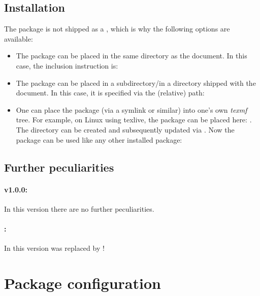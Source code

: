 \documentclass{sopra-base}
\begin{document}
\subsection{Installation}
    The package is not shipped as a , which is why the
    following options are available:
    \begin{itemize}
        \item The package can be placed in the same directory as the
                document. In this case, the inclusion instruction is:
\begin{plainlatex}
\usepackage{sopra-documentation}
\end{plainlatex}
        \item The package can be placed in a subdirectory/in a
                directory shipped with the document. In this case, it is
                specified via the (relative) path:
\begin{plainlatex}
\usepackage{./My/Path/to/sopra-documentation}
\end{plainlatex}
        \item One can place the package (via a symlink or similar)
              into one's own \emph{texmf} tree.
              For example, on Linux using texlive, the package can be
              placed here: .
              The directory can be created and subsequently updated via
              . Now the package can be used like
              any other installed package:
\begin{plainlatex}
\usepackage{sopra-documentation}
\end{plainlatex}
    \end{itemize}
    \subsection{Further peculiarities}
    \paragraph{v1.0.0:}
    In this version there are no further peculiarities.
    \paragraph{\protect\thesodversion:}
    In this version  was replaced by !

\section{Package configuration}
\end{document}
